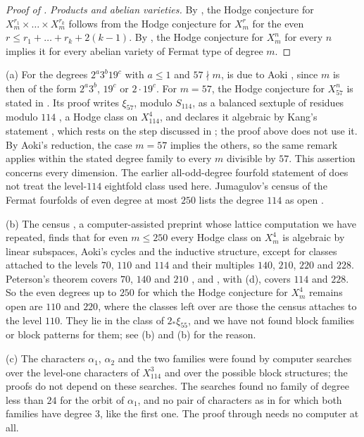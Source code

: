 \begin{proof}[Proof of ]
\emph{Products and abelian varieties.} By \cite[Theorem~IV]{Shi79}, the
Hodge conjecture for $X^{r_{1}}_{m}\times\dots\times X^{r_{k}}_{m}$ follows
from the Hodge conjecture for $X^{r}_{m}$ for the even $r\le r_{1}+\dots+
r_{k}+2(k-1)$. By \cite[Corollary~3.2]{Aok00}, the Hodge conjecture for
$X^{n}_{m}$ for every $n$ implies it for every abelian variety of Fermat
type of degree $m$.
\end{proof}

\begin{remark}\label{rem:new114}
(a) For the degrees $2^{a}3^{b}19^{c}$ with $a\le1$ and $57\nmid m$,
 is due to Aoki \cite[Theorem~0.1]{Aok00}, since $m$ is
then of the form $2^{a}3^{b}$, $19^{c}$ or $2\cdot19^{c}$. For $m=57$, the Hodge conjecture for $X^{n}_{57}$
is stated in \cite[Theorem~1.1]{MMRV26}. Its proof writes $\xi_{57}$, modulo
$S_{114}$, as a balanced sextuple of residues modulo $114$
\cite[Table~4]{MMRV26}, a Hodge class on $X^{4}_{114}$, and declares it
algebraic by Kang's statement \cite[Corollary~3.2]{Kan16}, which rests on the
step discussed in ; the proof above does not use it. By
Aoki's reduction, the case $m=57$ implies the others, so the same remark
applies within the stated degree family to every $m$ divisible by $57$.
This assertion concerns every dimension. The earlier all-odd-degree
fourfold statement of \cite{Li26a} does not treat the level-$114$
eightfold class used here.
Jumagulov's census of the Fermat fourfolds of even degree at most $250$
lists the degree $114$ as open \cite{Jum26b}.

(b) The census \cite{Jum26b}, a computer-assisted preprint whose lattice
computation we have repeated, finds that for even $m\le250$ every Hodge
class on $X^{4}_{m}$ is algebraic by linear subspaces, Aoki's cycles and the
inductive structure, except for classes attached to the levels $70$, $110$
and $114$ and their multiples $140$, $210$, $220$ and $228$. Peterson's
theorem covers $70$, $140$ and $210$ \cite{Pet26}, and
, with (d), covers $114$ and $228$.
So the even degrees up to $250$ for which the Hodge conjecture for
$X^{4}_{m}$ remains open are $110$ and $220$, where the classes left over
are those the census attaches to the level $110$. They lie in the class of
$2_{*}\xi_{55}$, and we have not found block families or block patterns
for them; see (b) and (b) for the
reason.

(c) The characters $\alpha_{1}$, $\alpha_{2}$ and the two families were
found by computer searches over the level-one characters of
$X^{3}_{114}$ and over the possible block structures; the proofs do not
depend on these searches. The searches found no family of degree less than
$24$ for the orbit of $\alpha_{1}$, and no pair of characters as in
 for which both families have degree $3$, like the first
one. The proof through  needs no computer at all.
\end{remark}

